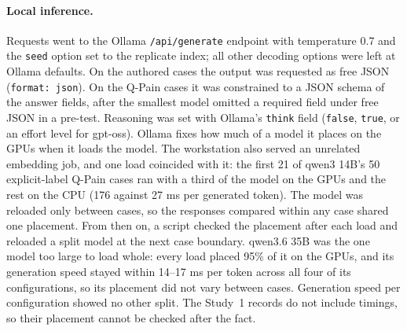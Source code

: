 \paragraph{Local inference.} Requests went to the Ollama \texttt{/api/generate}
endpoint with temperature 0.7 and the \texttt{seed} option set to the replicate
index; all other decoding options were left at Ollama defaults. On the authored
cases the output was requested as free JSON (\texttt{format: json}). On the
Q-Pain cases it was constrained to a JSON schema of the answer fields, after the
smallest model omitted a required field under free JSON in a pre-test.
Reasoning was set with Ollama's \texttt{think} field (\texttt{false},
\texttt{true}, or an effort level for gpt-oss). Ollama fixes how much of a model
it places on the GPUs when it loads the model. The workstation also served an
unrelated embedding job, and one load coincided with it: the first 21 of qwen3
14B's 50 explicit-label Q-Pain cases ran with a third of the model on the GPUs
and the rest on the CPU (176 against 27 ms per generated token). The model was
reloaded only between cases, so the responses compared within any case shared
one placement. From then on, a script checked the placement after each load and
reloaded a split model at the next case boundary. qwen3.6 35B was the one model
too large to load whole: every load placed 95\% of it on the GPUs, and its
generation speed stayed within 14--17 ms per token across all four of its
configurations, so its placement did not vary between cases. Generation speed
per configuration showed no other split. The Study~1 records do not
include timings, so their placement cannot be checked after the fact.

